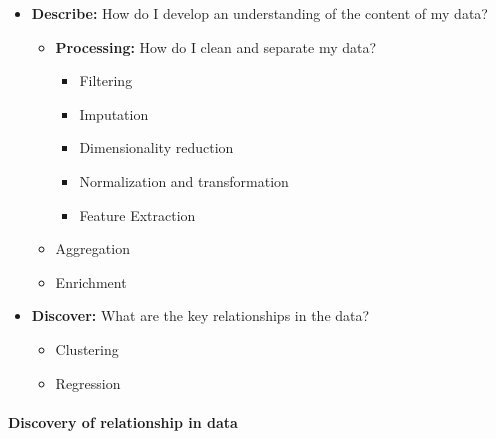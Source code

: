\documentclass[a4paper, landscape, 6pt, fleqn]{scrartcl}
\renewcommand{\emph}[1]{\textbf{#1}}
\begin{document}
\begin{multicols*}{4}
\begin{itemize}
\item \emph{Describe:} How do I develop an understanding of the content of my data?
\begin{itemize}
\item \emph{Processing:} How do I clean and separate my data?
\begin{itemize}
\item Filtering
\item Imputation
\item Dimensionality reduction
\item Normalization and transformation
\item Feature Extraction
\end{itemize}
\item Aggregation
\item Enrichment
\end{itemize}
\item \emph{Discover:} What are the key relationships in the data?
\begin{itemize}
\item Clustering
\item Regression
\end{itemize}
\end{itemize}

\paragraph{Discovery of relationship in data}


\end{multicols*}
\end{document}
